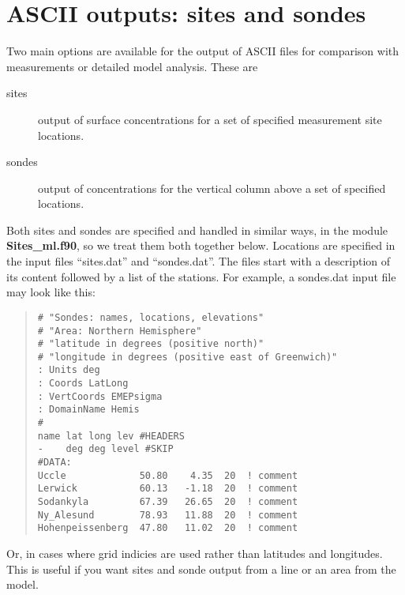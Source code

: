 \newpage
\section{ASCII outputs: sites and sondes}\label{sec:sitesonde}


Two main options are available for the output of ASCII files for comparison
with measurements or detailed model analysis. These are

\begin{description}
\item[sites]  

      output of surface concentrations for a set of specified
      measurement site locations.
\item[sondes] 

      output of concentrations for the vertical column above
     a set of specified locations.
\end{description}

Both sites and sondes are specified and handled in similar ways, in
the module {\bf Sites\_ml.f90}, so we treat them both together below.
Locations are specified in the input files ``sites.dat'' and ``sondes.dat''. 
The files start with a description of its content
followed by a list of the stations. For example, a sondes.dat input file
may look like this:

\begin{small}
\begin{quote}
\begin{verbatim}
# "Sondes: names, locations, elevations"
# "Area: Northern Hemisphere"
# "latitude in degrees (positive north)"
# "longitude in degrees (positive east of Greenwich)"
: Units deg
: Coords LatLong
: VertCoords EMEPsigma
: DomainName Hemis
#
name lat long lev #HEADERS
-    deg deg level #SKIP
#DATA:
Uccle             50.80    4.35  20  ! comment
Lerwick           60.13   -1.18  20  ! comment
Sodankyla         67.39   26.65  20  ! comment
Ny_Alesund        78.93   11.88  20  ! comment
Hohenpeissenberg  47.80   11.02  20  ! comment
\end{verbatim}

\end{quote}
\end{small}

Or, in cases where grid indicies are used rather than latitudes and 
longitudes. This is useful if you want sites and sonde output from a line 
or an area from the model. 


